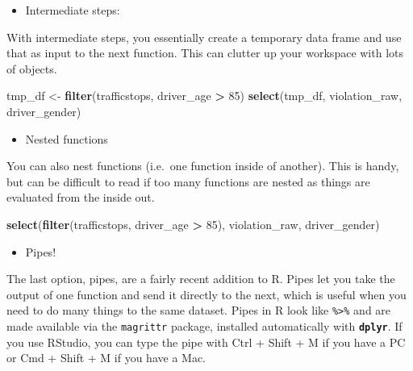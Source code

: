 \documentclass[]{book}
\newenvironment{Shaded}{\begin{snugshade}}{\end{snugshade}}
\newcommand{\DecValTok}[1]{\textcolor[rgb]{0.00,0.00,0.81}{#1}}
\newcommand{\KeywordTok}[1]{\textcolor[rgb]{0.13,0.29,0.53}{\textbf{#1}}}
\newcommand{\NormalTok}[1]{#1}
\newcommand{\OperatorTok}[1]{\textcolor[rgb]{0.81,0.36,0.00}{\textbf{#1}}}
\newcommand{\StringTok}[1]{\textcolor[rgb]{0.31,0.60,0.02}{#1}}
\providecommand{\tightlist}{%
  \setlength{\itemsep}{0pt}\setlength{\parskip}{0pt}}
\begin{document}
\begin{itemize}
\tightlist
\item
  Intermediate steps:
\end{itemize}

With intermediate steps, you essentially create a temporary data frame and use
that as input to the next function. This can clutter up your workspace with lots
of objects.

\begin{Shaded}
\begin{Highlighting}[]
\NormalTok{tmp_df <-}\StringTok{ }\KeywordTok{filter}\NormalTok{(trafficstops, driver_age }\OperatorTok{>}\StringTok{ }\DecValTok{85}\NormalTok{)}
\KeywordTok{select}\NormalTok{(tmp_df, violation_raw, driver_gender)}
\end{Highlighting}
\end{Shaded}

\begin{itemize}
\tightlist
\item
  Nested functions
\end{itemize}

You can also nest functions (i.e.~one function inside of another).
This is handy, but can be difficult to read if too many functions are nested as things are evaluated from the inside out.

\begin{Shaded}
\begin{Highlighting}[]
\KeywordTok{select}\NormalTok{(}\KeywordTok{filter}\NormalTok{(trafficstops, driver_age }\OperatorTok{>}\StringTok{ }\DecValTok{85}\NormalTok{), violation_raw, driver_gender)}
\end{Highlighting}
\end{Shaded}

\begin{itemize}
\tightlist
\item
  Pipes!
\end{itemize}

The last option, pipes, are a fairly recent addition to R. Pipes let you take
the output of one function and send it directly to the next, which is useful
when you need to do many things to the same dataset. Pipes in R look like
\texttt{\%\textgreater{}\%} and are made available via the \texttt{magrittr} package, installed automatically
with \textbf{\texttt{dplyr}}. If you use RStudio, you can type the pipe with Ctrl
+ Shift + M if you have a PC or Cmd +
Shift + M if you have a Mac.

\begin{Shaded}
\end{Shaded}
\end{document}
